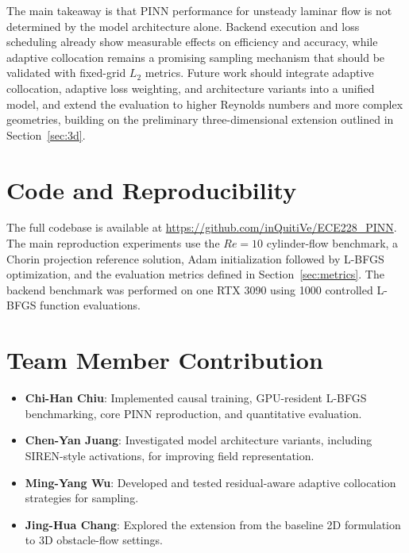 \documentclass{article}
\begin{document}
The main takeaway is that PINN performance for unsteady laminar flow is not determined by the model architecture alone. Backend execution and loss scheduling already show measurable effects on efficiency and accuracy, while adaptive collocation remains a promising sampling mechanism that should be validated with fixed-grid $L_2$ metrics. Future work should integrate adaptive collocation, adaptive loss weighting, and architecture variants into a unified model, and extend the evaluation to higher Reynolds numbers and more complex geometries, building on the preliminary three-dimensional extension outlined in Section~\ref{sec:3d}.

\section{Code and Reproducibility}

The full codebase is available at \url{https://github.com/inQuitiVe/ECE228_PINN}. The main reproduction experiments use the $Re=10$ cylinder-flow benchmark, a Chorin projection reference solution, Adam initialization followed by L-BFGS optimization, and the evaluation metrics defined in Section~\ref{sec:metrics}. The backend benchmark was performed on one RTX 3090 using 1000 controlled L-BFGS function evaluations.

\section{Team Member Contribution}

\begin{itemize}
    \item \textbf{Chi-Han Chiu}: Implemented causal training, GPU-resident L-BFGS benchmarking, core PINN reproduction, and quantitative evaluation.
    \item \textbf{Chen-Yan Juang}: Investigated model architecture variants, including SIREN-style activations, for improving field representation.
    \item \textbf{Ming-Yang Wu}: Developed and tested residual-aware adaptive collocation strategies for sampling.
    \item \textbf{Jing-Hua Chang}: Explored the extension from the baseline 2D formulation to 3D obstacle-flow settings.
\end{itemize}



\end{document}
